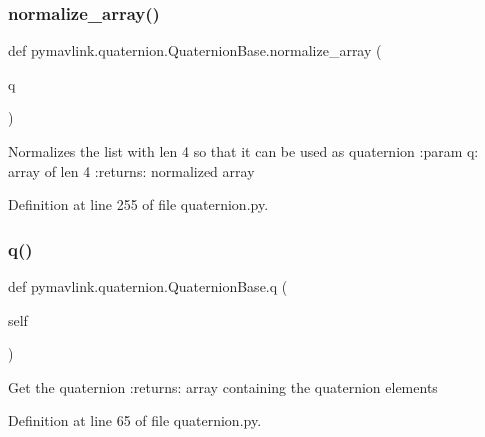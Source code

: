 \mbox{\label{classpymavlink_1_1quaternion_1_1QuaternionBase_a074bda381cb981dcd546d196b94f0f65}} 
\subsubsection{\texorpdfstring{normalize\_array()}{normalize\_array()}}
{\footnotesize\ttfamily def pymavlink.\+quaternion.\+Quaternion\+Base.\+normalize\+\_\+array (\begin{DoxyParamCaption}\item[{}]{q }\end{DoxyParamCaption})\hspace{0.3cm}{\ttfamily [static]}}

\begin{DoxyVerb}Normalizes the list with len 4 so that it can be used as quaternion
:param q: array of len 4
:returns: normalized array
\end{DoxyVerb}
 

Definition at line 255 of file quaternion.\+py.

\mbox{\label{classpymavlink_1_1quaternion_1_1QuaternionBase_a5afdd0b6ec9069e6f0e0bf2032cf9fe6}} 
\subsubsection{\texorpdfstring{q()}{q()}\hspace{0.1cm}{\footnotesize\ttfamily [1/2]}}
{\footnotesize\ttfamily def pymavlink.\+quaternion.\+Quaternion\+Base.\+q (\begin{DoxyParamCaption}\item[{}]{self }\end{DoxyParamCaption})}

\begin{DoxyVerb}Get the quaternion
:returns: array containing the quaternion elements
\end{DoxyVerb}
 

Definition at line 65 of file quaternion.\+py.

